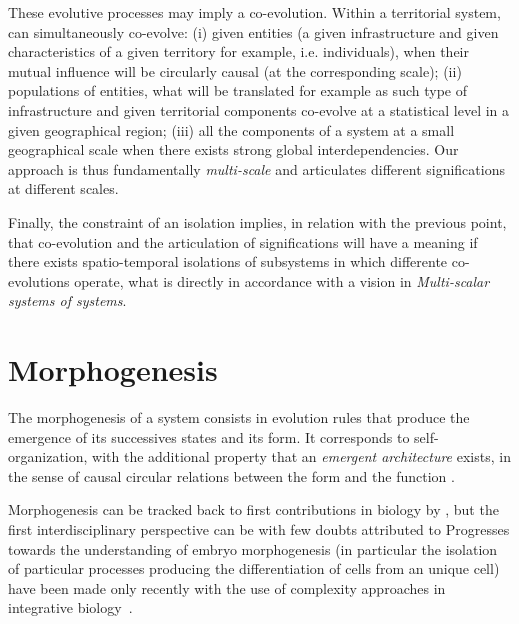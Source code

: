 \documentclass[letterpaper]{article}
\begin{document}
These evolutive processes may imply a co-evolution. Within a territorial system, can simultaneously co-evolve: (i) given entities (a given infrastructure and given characteristics of a given territory for example, i.e. individuals), when their mutual influence will be circularly causal (at the corresponding scale); (ii) populations of entities, what will be translated for example as such type of infrastructure and given territorial components co-evolve at a statistical level in a given geographical region; (iii) all the components of a system at a small geographical scale when there exists strong global interdependencies. Our approach is thus fundamentally \emph{multi-scale} and articulates different significations at different scales.

Finally, the constraint of an isolation implies, in relation with the previous point, that co-evolution and the articulation of significations will have a meaning if there exists spatio-temporal isolations of subsystems in which differente co-evolutions operate, what is directly in accordance with a vision in \emph{Multi-scalar systems of systems}.












\section{Morphogenesis}






The morphogenesis of a system consists in evolution rules that produce the emergence of its successives states and its form. It corresponds to self-organization, with the additional property that an \emph{emergent architecture} exists, in the sense of causal circular relations between the form and the function \cite{doursat2013review}.



Morphogenesis can be tracked back to first contributions in biology by \cite{}, but the first interdisciplinary perspective can be with few doubts attributed to \cite{}
Progresses towards the understanding of embryo morphogenesis (in particular the isolation of particular processes producing the differentiation of cells from an unique cell) have been made only recently with the use of complexity approaches in integrative biology~\cite{delile2016chapitre}.
\end{document}
